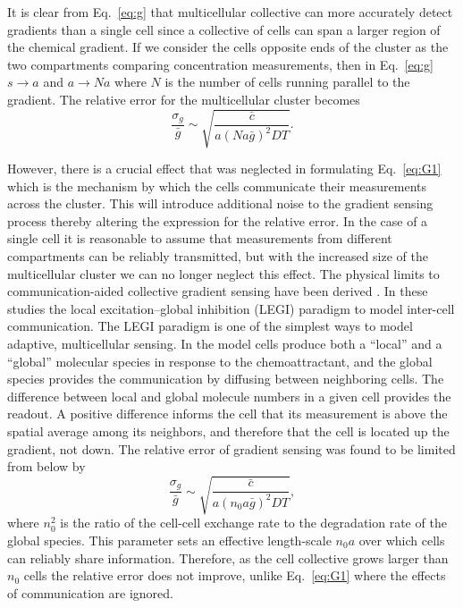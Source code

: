 \documentclass[a4paper]{article}
\begin{document}
It is clear from Eq.\ \ref{eq:g} that multicellular collective can more accurately detect gradients than a single cell since a collective of cells can span a larger region of the chemical gradient. If we consider the cells opposite ends of the cluster as the two compartments comparing concentration measurements, then in Eq.\ \ref{eq:g} $s \to a$ and $a \to Na$ where $N$ is the number of cells running parallel to the gradient. The relative error for the multicellular cluster becomes \cite{mugler2015limits}
\begin{equation} \label{eq:G1}
\frac{\sigma_g}{\bar{g}} \sim \sqrt{\frac{\bar{c}}{a(Na\bar{g})^2DT}}.
\end{equation}

However, there is a crucial effect that was neglected in formulating Eq.\ \ref{eq:G1} which is the mechanism by which the cells communicate their measurements across the cluster. This will introduce additional noise to the gradient sensing process thereby altering the expression for the relative error. In the case of a single cell it is reasonable to assume that measurements from different compartments can be reliably transmitted, but with the increased size of the multicellular cluster we can no longer neglect this effect. The physical limits to communication-aided collective gradient sensing have been derived \cite{ellison2015cell, mugler2015limits}. In these studies the local excitation--global inhibition (LEGI) paradigm \cite{levchenko2002models} to model inter-cell communication. The LEGI paradigm is one of the simplest ways to model adaptive, multicellular sensing. In the model cells produce both a ``local'' and a ``global'' molecular species in response to the chemoattractant, and the global species provides the communication by diffusing between neighboring cells. The difference between local and global molecule numbers in a given cell provides the readout. A positive difference informs the cell that its measurement is above the spatial average among its neighbors, and therefore that the cell is located up the gradient, not down. The relative error of gradient sensing was found to be limited from below by
\begin{equation} \label{eq:G2}
\frac{\sigma_g}{\bar{g}} \sim \sqrt{\frac{\bar{c}}{a(n_0a\bar{g})^2DT}},
\end{equation}
where $n_0^2$ is the ratio of the cell-cell exchange rate to the degradation rate of the global species. This parameter sets an effective length-scale $n_0a$ over which cells can reliably share information. Therefore, as the cell collective grows larger than $n_0$ cells the relative error does not improve, unlike Eq.\ \ref{eq:G1} where the effects of communication are ignored.
\end{document}
